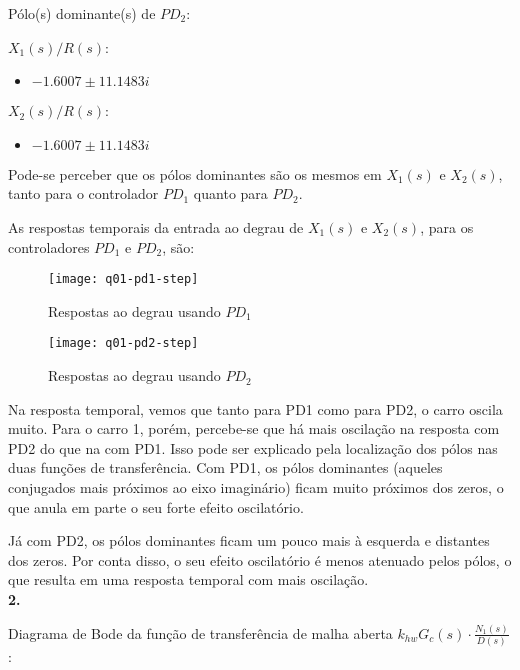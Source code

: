 \documentclass[a4paper,11pt]{article}
\begin{document}
Pólo(s) dominante(s) de $PD_2$:

\begin{multicols}{2}
    $X_1\left(s\right) / R\left(s\right)$:
    \begin{itemize}
        \item $-1.6007 \pm 11.1483i$
    \end{itemize}
\columnbreak
    $X_2\left(s\right) / R\left(s\right)$:
    \begin{itemize}
        \item $-1.6007 \pm 11.1483i$
    \end{itemize}
\end{multicols}

Pode-se perceber que os pólos dominantes são os mesmos em $X_1\left(s\right)$ e
$X_2\left(s\right)$, tanto para o controlador $PD_1$ quanto para $PD_2$.

\pagebreak

As respostas temporais da entrada ao degrau de $X_1\left(s\right)$ e
$X_2\left(s\right)$, para os controladores $PD_1$ e $PD_2$, são:

\begin{figure}[H]
\centering
\texttt{[image: q01-pd1-step]}
\caption{Respostas ao degrau usando $PD_1$}
\end{figure}

\begin{figure}[H]
\centering
\texttt{[image: q01-pd2-step]}
\caption{Respostas ao degrau usando $PD_2$}
\end{figure}

Na resposta temporal, vemos que tanto para PD1 como para PD2, o carro oscila
muito. Para o carro 1, porém, percebe-se que há mais oscilação na resposta com
PD2 do que na com PD1. Isso pode ser explicado pela localização dos pólos nas
duas funções de transferência. Com PD1, os pólos dominantes (aqueles conjugados
mais próximos ao eixo imaginário) ficam muito próximos dos zeros, o que anula em
parte o seu forte efeito oscilatório.

Já com PD2, os pólos dominantes ficam um pouco mais à esquerda e distantes dos
zeros. Por conta disso, o seu efeito oscilatório é menos atenuado pelos pólos,
o que resulta em uma resposta temporal com mais oscilação. \\

\textbf{2.}

Diagrama de Bode da função de transferência de malha aberta
$k_{hw} G_c\left(s\right) \cdot \frac{N_1\left(s\right)}{D\left(s\right)}$:
\end{document}
